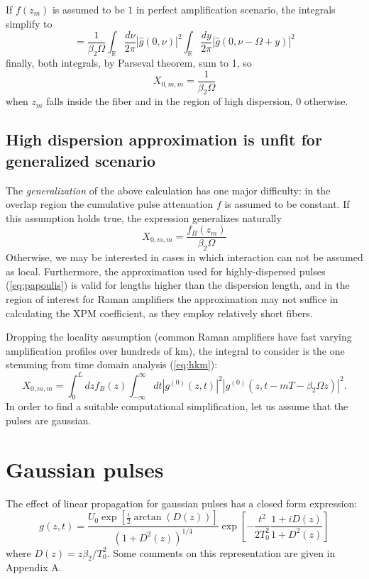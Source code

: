 \documentclass[10pt, lettersize, journal, onecolumn]{IEEEtran}
\begin{document}
If $f(z_m)$ is assumed to be $1$ in perfect amplification scenario, the integrals simplify to
\begin{equation}
	=\frac{1}{ \beta_2 \Omega}\int_{\mathbb{R}} \frac{d\nu}{2\pi}  |\hat{g}(0, \nu)|^2 \int_{\mathbb{R}}  \frac{dy}{2\pi} \left|\hat{g}\left(0, \nu-\Omega + y\right)\right|^2
\end{equation}
finally, both integrals, by Parseval theorem, sum to 1, so 
\begin{equation}
	X_{0, m, m} = \frac{1}{\beta_2 \Omega}  
\end{equation}
when $z_m$ falls inside the fiber and in the region of high dispersion, $0$ otherwise.

	\subsection{High dispersion approximation is unfit for generalized scenario}
The \textit{generalization} of the above calculation has one major difficulty: in the overlap region the cumulative pulse attenuation $f$ is assumed to be constant.
If this assumption holds true, the expression generalizes naturally
\begin{equation}
	X_{0, m, m} = \frac{f_B(z_m)}{\beta_2 \Omega}	
\end{equation}
Otherwise, we may be interested in cases in which interaction can not be assumed as local. 
Furthermore, the approximation used for highly-dispersed pulses (\ref{eq:papoulis}) is valid for lengths higher than the dispersion length, and in the region of interest for Raman amplifiers the approximation may not suffice in calculating the XPM coefficient, as they employ relatively short fibers.

Dropping the locality assumption (common Raman amplifiers have fast varying amplification profiles over hundreds of km), the integral to consider is the one stemming from time domain analysis (\ref{eq:hkm}):
\begin{equation}\label{eq:0mm}
	X_{0, m, m} = \int_{0}^{L} dz f_B(z) \int_{-\infty}^{\infty} dt |g^{(0)}(z, t)|^2 |g^{(0)}(z, t-mT-\beta_2 \Omega z)|^2.
\end{equation}
In order to find a suitable computational simplification, let us assume that the pulses are gaussian.
\section{Gaussian pulses} \label{gauss}
The effect of linear propagation for gaussian pulses has a closed form expression:
\begin{equation}\label{eq:field}
	g(z, t) = \frac{U_0 \exp[\frac{i}{2} \arctan(D(z))]}{(1+D^2(z))^{1/4}} \exp\left[-\frac{t^2}{2T_0^2} \frac{1+iD(z)}{1+D^2(z)}\right]
\end{equation}
where $D(z) = z\beta_2 / T_0^2$. Some comments on this representation are given in Appendix A.
\end{document}
